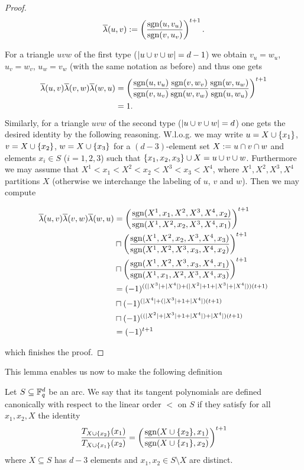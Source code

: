 \documentclass[a4paper]{article}
\begin{document}
\begin{proof}
  \begin{equation}
    \overline{\lambda}(u,v):=\left(\frac{\mathop\mathrm{sgn}(u,v_u)}{\mathop\mathrm{sgn}(v,u_v)}\right)^{t+1}\text{.}
  \end{equation}

  For a triangle $uvw$ of the first type ($\left|u\cup v\cup w\right|=d-1$) we obtain $v_u=w_u$, $u_v=w_v$, $u_w=v_w$ (with the same notation as before) and thus one gets
  \begin{align}
    \overline{\lambda}(u,v)\overline{\lambda}(v,w)\overline{\lambda}(w,u) & =\left(\frac{\mathop\mathrm{sgn}(u,v_u)}{\mathop\mathrm{sgn}(v,u_v)}\frac{\mathop\mathrm{sgn}(v,w_v)}{\mathop\mathrm{sgn}(w,v_w)}\frac{\mathop\mathrm{sgn}(w,u_w)}{\mathop\mathrm{sgn}(u,w_u)}\right)^{t+1}\\
    & =1\text{.}
  \end{align}
  Similarly, for a triangle $uvw$ of the second type ($\left|u\cup v\cup w\right|=d$) one gets the desired identity by the following reasoning. W.l.o.g. we may write $u=X\cup\{x_1\}$, $v=X\cup\{x_2\}$, $w=X\cup\{x_3\}$ for a $(d-3)$-element set $X:=u\cap v\cap w$ and elements $x_i\in S$ ($i=1,2,3$) such that $\{x_1,x_2,x_3\}\cup X=u\cup v\cup w$. Furthermore we may assume that $X^1<x_1<X^2<x_2<X^3<x_3<X^4$, where $X^1,X^2,X^3,X^4$ partitions $X$ (otherwise we interchange the labeling of $u$, $v$ and $w$). Then we may compute

  \begin{align}
    \overline{\lambda}(u,v)\overline{\lambda}(v,w)\overline{\lambda}(w,u) 
    & = \left(\frac{\mathop\mathrm{sgn}(X^1,x_1,X^2,X^3,X^4,x_2)}{\mathop\mathrm{sgn}(X^1,X^2,x_2,X^3,X^4,x_1)}\right)^{t+1}\\
    & \mathbin{\sqcap} \left(\frac{\mathop\mathrm{sgn}(X^1,X^2,x_2,X^3,X^4,x_3)}{\mathop\mathrm{sgn}(X^1,X^2,X^3,x_3,X^4,x_2)}\right)^{t+1}\\
    & \mathbin{\sqcap} \left(\frac{\mathop\mathrm{sgn}(X^1,X^2,X^3,x_3,X^4,x_1)}{\mathop\mathrm{sgn}(X^1,x_1,X^2,X^3,X^4,x_3)}\right)^{t+1}\\
    & = (-1)^{((|X^3|+|X^4|)+(|X^2|+1+|X^3|+|X^4|))(t+1)}\\
    & \mathbin{\sqcap} (-1)^{(|X^4|+(|X^3|+1+|X^4|)(t+1)}\\
    & \mathbin{\sqcap} (-1)^{((|X^2|+|X^3|+1+|X^4|)+|X^4|)(t+1)}\\
    & = (-1)^{t+1}
  \end{align}

  which finishes the proof.
\end{proof}

This lemma enables us now to make the following definition

\begin{definition}
  Let $S\subseteq\mathbb{F}_{q}^d$ be an arc. We say that its tangent polynomials are defined canonically with respect to the linear order $<$ on $S$ if they satisfy for all $x_1,x_2,X$ the identity
\begin{equation}
 \frac{T_{X\cup\{x_2\}}(x_1)}{T_{X\cup\{x_1\}}(x_2)} = \left(\frac{\mathop\mathrm{sgn}(X\cup\{x_2\},x_1)}{\mathop\mathrm{sgn}(X\cup\{x_1\},x_2)}\right)^{t+1}
  \end{equation}
  where $X\subseteq S$ has $d-3$ elements and $x_1,x_2\in S\setminus X$ are distinct.
\end{definition}
\end{document}
